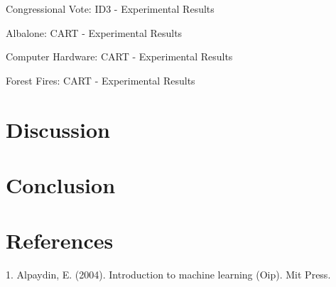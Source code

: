 \documentclass[twoside,11pt]{article}
\begin{document}
\begin{table}[h]
		\centering
		\caption{Congressional Vote: ID3 - Experimental Results}
		\label{tab:table3}
\end{table}

\begin{table}[h]
	\centering
	\caption{Albalone: CART - Experimental Results}
	\label{tab:table4}
\end{table}

\begin{table}[h]
	\centering
	\caption{Computer Hardware: CART - Experimental Results}
	\label{tab:tale5}
\end{table}

\begin{table}[h]
	\centering
	\caption{Forest Fires: CART - Experimental Results}
	\label{tab:table6}
\end{table}



\newpage

\section{Discussion}
\hspace*{10mm} 

\section{Conclusion}
\hspace*{10mm} 

\section{References}
1. Alpaydin, E. (2004). Introduction to machine learning (Oip). Mit Press. 

\newpage
\end{document}
